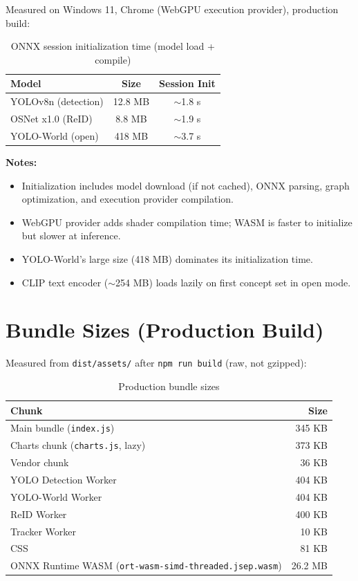 Measured on Windows 11, Chrome (WebGPU execution provider), production build:

\begin{table}[htbp]
\centering
\caption{ONNX session initialization time (model load + compile)}
\label{tab:init-times}
\begin{tabular}{@{}lcc@{}}
\toprule
\textbf{Model} & \textbf{Size} & \textbf{Session Init} \\
\midrule
YOLOv8n (detection) & 12.8 MB & $\sim$1.8 s \\
OSNet x1.0 (ReID)   & 8.8 MB  & $\sim$1.9 s \\
YOLO-World (open)   & 418 MB  & $\sim$3.7 s \\
\bottomrule
\end{tabular}
\end{table}

\vspace{0.3cm}

\noindent \textbf{Notes:}
\begin{itemize}
    \item Initialization includes model download (if not cached), ONNX parsing, graph optimization, and execution provider compilation.
    \item WebGPU provider adds shader compilation time; WASM is faster to initialize but slower at inference.
    \item YOLO-World's large size (418 MB) dominates its initialization time.
    \item CLIP text encoder ($\sim$254 MB) loads lazily on first concept set in open mode.
\end{itemize}

\section{Bundle Sizes (Production Build)}
\label{sec:bundle}

Measured from \texttt{dist/assets/} after \texttt{npm run build} (raw, not gzipped):

\begin{table}[htbp]
\centering
\caption{Production bundle sizes}
\label{tab:bundle}
\begin{tabular}{@{}lr@{}}
\toprule
\textbf{Chunk} & \textbf{Size} \\
\midrule
Main bundle (\texttt{index.js}) & 345 KB \\
Charts chunk (\texttt{charts.js}, lazy) & 373 KB \\
Vendor chunk & 36 KB \\
YOLO Detection Worker & 404 KB \\
YOLO-World Worker & 404 KB \\
ReID Worker & 400 KB \\
Tracker Worker & 10 KB \\
CSS & 81 KB \\
\hline
ONNX Runtime WASM (\texttt{ort-wasm-simd-threaded.jsep.wasm}) & 26.2 MB \\
\bottomrule
\end{tabular}
\end{table}

